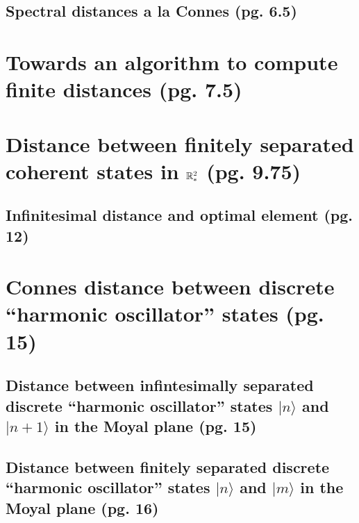 \documentclass{article}
\begin{document}
\subsection{Spectral distances a la Connes (pg. 6.5)}

\section{Towards an algorithm to compute finite distances (pg. 7.5)}

\section{Distance between finitely separated coherent states in $\mathbb{R}^2_*$ (pg. 9.75)}

\subsection{Infinitesimal distance and optimal element (pg. 12)}

\section{Connes distance between discrete ``harmonic oscillator'' states (pg. 15)}

\subsection{Distance between infintesimally separated discrete ``harmonic oscillator'' states $|n\rangle$ and $|n+1\rangle$ in the Moyal plane (pg. 15)}

\subsection{Distance between finitely separated discrete ``harmonic oscillator'' states $|n\rangle$ and $|m\rangle$ in the Moyal plane (pg. 16)}
\end{document}
